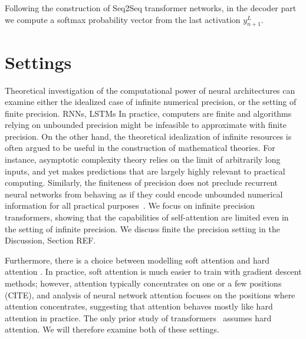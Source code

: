 \documentclass[11pt,a4paper]{article}
\begin{document}
Following the construction of Seq2Seq transformer networks, in the decoder part we compute a softmax probability vector from the last activation $y_{n+1}^L$.







\section{Settings}

Theoretical investigation of the computational power of neural architectures can examine either the idealized case of infinite numerical precision, or the setting of finite precision.
RNNs, LSTMs
In practice, computers are finite and algorithms relying on unbounded precision might be infeasible to approximate with finite precision.
On the other hand, the theoretical idealization of infinite resources is often argued to be useful in the construction of mathematical theories.
For instance, asymptotic complexity theory relies on the limit of arbitrarily long inputs, and yet makes predictions that are largely highly relevant to practical computing.
Similarly, the finiteness of precision does not preclude recurrent neural networks  from behaving as if they could encode unbounded numerical information for all practical purposes~\cite{weiss2018practical}.
We focus on infinite precision transformers, showing that the capabilities of self-attention are limited even in the setting of infinite precision.
We discuss finite the precision setting in the Discussion, Section REF.

Furthermore, there is a choice between modelling soft attention and hard attention \cite{shen2018reinforced}.
In practice, soft attention is much easier to train with gradient descent methods; however, attention typically concentrates on one or a few positions (CITE), and analysis of neural network attention focuses on the positions where attention concentrates, suggesting that attention behaves mostly like hard attention in practice.
The only prior study of transformers~\cite{perez2019turing} assumes hard attention.
We will therefore examine both of these settings.
\end{document}
